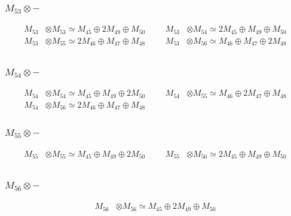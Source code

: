 \subsubsection{$ M_{53}\otimes -$}
\begin{align*}
M_{53} &\otimes M_{53} \simeq M_{45} \oplus 2M_{49} \oplus M_{50} &&& M_{53} &\otimes M_{54} \simeq 2M_{45} \oplus M_{49} \oplus M_{50}\\
M_{53} &\otimes M_{55} \simeq 2M_{46} \oplus M_{47} \oplus M_{48} &&& M_{53} &\otimes M_{56} \simeq M_{46} \oplus M_{47} \oplus 2M_{48}\\
\end{align*}

\subsubsection{$ M_{54}\otimes -$}
\begin{align*}
M_{54} &\otimes M_{54} \simeq M_{45} \oplus M_{49} \oplus 2M_{50} &&& M_{54} &\otimes M_{55} \simeq M_{46} \oplus 2M_{47} \oplus M_{48}\\
M_{54} &\otimes M_{56} \simeq 2M_{46} \oplus M_{47} \oplus M_{48}
\end{align*}

\subsubsection{$ M_{55}\otimes -$}
\begin{align*}
M_{55} &\otimes M_{55} \simeq M_{45} \oplus M_{49} \oplus 2M_{50} &&& M_{55} &\otimes M_{56} \simeq 2M_{45} \oplus M_{49} \oplus M_{50}\\
\end{align*}

\subsubsection{$ M_{56}\otimes -$}
\begin{align*}
M_{56} &\otimes M_{56} \simeq M_{45} \oplus 2M_{49} \oplus M_{50}
\end{align*}

